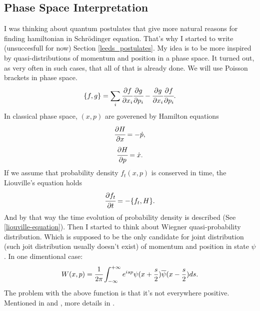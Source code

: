 \documentclass[main.tex]{subfiles}
\begin{document}
\subsection{Phase Space Interpretation}
I was thinking about quantum postulates that give more natural reasons for finding hamiltonian in Schrödinger equation. That's why I started to write (unsuccesfull for now) Section \ref{leeds_postulates}. My idea is to be more inspired by quasi-distributions of momentum and position in a phase space. It turned out, as very often in such cases, that all of that is already done.
We will use Poisson brackets in phase space.
\begin{equation}
\{f, g\} = \sum_i \cfrac{\partial f}{\partial x_i}\cfrac{\partial g}{\partial p_i} - \cfrac{\partial g}{\partial x_i}\cfrac{\partial f}{\partial p_i}. 
\end{equation}
In classical phase space, $(x,p)$ are goverened by Hamilton equations
\begin{equation}
\cfrac{\partial H}{\partial x} = -\dot{p},
\end{equation}
\begin{equation}
\cfrac{\partial H}{\partial p} = \dot{x}.
\end{equation}
If we assume that probability density $f_t(x,p)$ is conserved in time, the Liouville's equation holds
\begin{equation}
\cfrac{\partial f_t}{\partial t} = - \{f_t, H\}.
\end{equation}
And by that way the time evolution of probability density is described (See \ref{liouville-equation}).
Then I started to think about Wiegner quasi-probability distribution. Which is supposed to be the only candidate for joint distribution (such joit distribution usually doesn't exist) of momentum and position in state $\psi$. In one dimentional case:
\begin{equation}
W(x, p) = \cfrac{1}{2\pi} \int_{-\infty}^{+\infty}e^{isp}\psi(x + \frac{s}{2})\overline{\psi}(x - \frac{s}{2}) ds.
\end{equation}
The problem with the above function is that it's not everywhere positive. 
Mentioned in  \cite{suppes1961} and \cite[see][2.1.4
Joint probabilities in quantum mechanics]{breure-petruccione2002}, more details in \cite[see][3.4 Characteristic functions; The Wigner Distribution Function]{louisell1990}.
\end{document}
